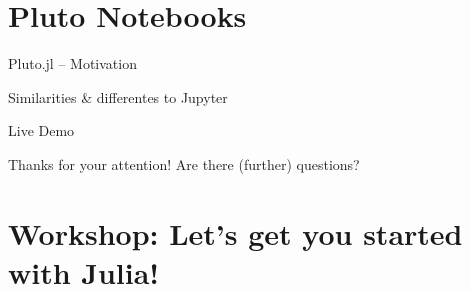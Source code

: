 \documentclass[aspectratio=169, 12pt]{beamer}
\begin{document}
    \section{Pluto Notebooks}
    \begin{frame}{Pluto.jl – Motivation}
    \end{frame}
    \begin{frame}{Similarities \& differentes to Jupyter}
    \end{frame}
    \begin{frame}{Live Demo}
    \end{frame}
    \begin{frame}{Thanks for your attention!}
        Are there (further) questions?
    \end{frame}
    \section{Workshop: Let's get you started with Julia!}
\end{document}
